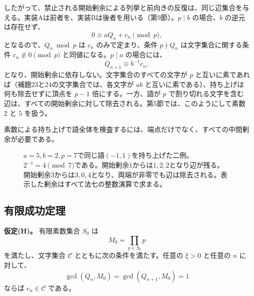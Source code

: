 \documentclass[11pt,reqno]{amsart}
\theoremstyle{definition}
\theoremstyle{definition}
\theoremstyle{remark}
\begin{document}
したがって、禁止される開始剰余による列挙と前向きの反復は、同じ辺集合を与える。実装Aは前者を、実装Bは後者を用いる（第9節）。\(p\mid b\) の場合、\(b\) の逆元は存在せず、
\[
0\equiv aQ_n+c_n\pmod p,
\]
となるので、\(Q_n\bmod p\) は \(c_n\) のみで定まり、条件 \(p\nmid Q_n\) は文字集合に関する条件 \(c_n\not\equiv0\pmod p\) と同値になる。\(p\mid a\) の場合には、
\[
Q_{n+1}\equiv b^{-1}c_n,
\]
となり、開始剰余に依存しない。文字集合のすべての文字が \(p\) と互いに素であれば（補題23と24の文字集合では、各文字が \(ab\) と互いに素である）、持ち上げは何も除去せずに頂点を \(p-1\) 倍にする。一方、語が \(p\) で割り切れる文字を含む辺は、すべての開始剰余に対して除去される。第5節では、このようにして素数 \(2\) と \(5\) を扱う。

素数による持ち上げで語全体を検査するには、端点だけでなく、すべての中間剰余が必要である。

\begin{figure}[htbp]
\centering

\caption{\(a=5,b=2,p=7\)で同じ語\((-1,1)\)を持ち上げた二例。\(2^{-1}=4\pmod7\)である。開始剰余\(1\)からは\(1,2,2\)となり辺が残る。開始剰余\(3\)からは\(3,0,4\)となり、両端が非零でも辺は除去される。表示した剰余はすべて法七の整数演算で求まる。}
\label{fig:prime-lift}
\end{figure}

\subsection{有限成功定理}\label{sec:4.5}

\textbf{仮定(H)。} 有限素数集合 \(S_0\) は
\[
M_0=\prod_{p\in S_0}p
\]
を満たし、文字集合 \(\mathcal C\) とともに次の条件を満たす。任意の \(\xi>0\) と任意の \(n\) に対して、
\[
\gcd(Q_n,M_0)=\gcd(Q_{n+1},M_0)=1
\]
ならば \(c_n\in\mathcal C\) である。
\end{document}
